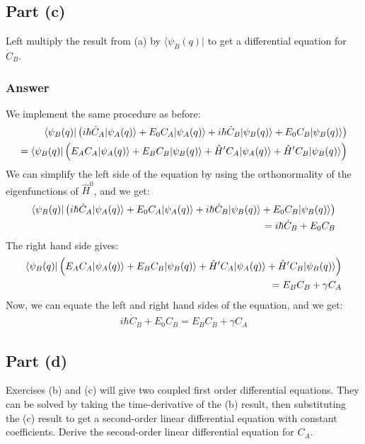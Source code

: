 \documentclass{article}
\begin{document}
\subsection{Part (c)}
Left multiply the result from (a) by \( \langle \psi_B(q) \lvert \) to get a differential equation for \( \dot{C}_B \).
\subsubsection{Answer}
We implement the same procedure as before:
\begin{align}
\bra{\psi _B(q)} \left( i\hbar\dot{C}_A \lvert \psi_A(q) \rangle + E_0 C_A \lvert \psi_A(q) \rangle + i\hbar\dot{C}_B \lvert \psi_B(q) \rangle + E_0 C_B \lvert \psi_B(q) \rangle \right) \\ = \bra{\psi _B(q)} \left( E_A C_A \lvert \psi_A(q) \rangle + E_B C_B \lvert \psi_B(q) \rangle + \hat{H}' C_A \lvert \psi_A(q) \rangle + \hat{H}' C_B \lvert \psi_B(q) \rangle \right)
\end{align}
We can simplify the left side of the equation by using the orthonormality of the eigenfunctions of \( \hat{H}^0 \), and we get:
\begin{align}
\bra{\psi _B(q)} \left( i\hbar\dot{C}_A \lvert \psi_A(q) \rangle + E_0 C_A \lvert \psi_A(q) \rangle + i\hbar\dot{C}_B \lvert \psi_B(q) \rangle + E_0 C_B \lvert \psi_B(q) \rangle \right) \\ = i \hbar \dot{C}_B + E_0 C_B
\end{align}
The right hand side gives:
\begin{align}
\bra{\psi _B(q)} \left( E_A C_A \lvert \psi_A(q) \rangle + E_B C_B \lvert \psi_B(q) \rangle + \hat{H}' C_A \lvert \psi_A(q) \rangle + \hat{H}' C_B \lvert \psi_B(q) \rangle \right) \\ = E_B C_B + \gamma C_A
\end{align}
Now, we can equate the left and right hand sides of the equation, and we get:
\begin{align}
i \hbar \dot{C}_B + E_0 C_B = E_B C_B + \gamma C_A
\end{align}

\subsection{Part (d)}
Exercises (b) and (c) will give two coupled first order differential equations. They can be solved by taking the time-derivative of the (b) result, then substituting the (c) result to get a second-order linear differential equation with constant coefficients. Derive the second-order linear differential equation for \( C_A \).
\end{document}
